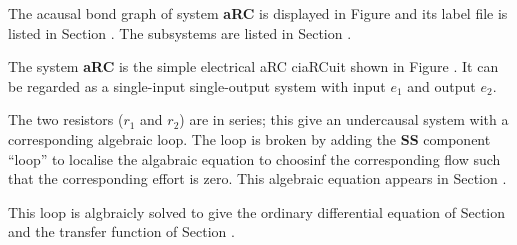 

   The acausal bond graph of system \textbf{aRC} is
   displayed in Figure  and its label
   file is listed in Section .
   The subsystems are listed in Section .

The system \textbf{aRC} is the simple electrical aRC ciaRCuit shown in
Figure . It can be regarded as a single-input
single-output system with input $e_1$ and output $e_2$.

The two resistors ($r_1$ and $r_2$) are in series; this give an
undercausal system with a corresponding algebraic loop. The loop is
broken by adding the {\bf SS} component ``loop'' to localise the
algabraic equation to choosinf the corresponding flow such that the
corresponding effort is zero. This algebraic equation appears in
Section .

This loop is algbraicly solved to give the ordinary differential
equation of Section  and the transfer function of
Section .
